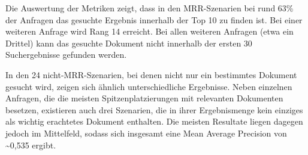 Die Auswertung der Metriken zeigt, dass in den MRR-Szenarien bei rund 63\% der Anfragen das gesuchte Ergebnis innerhalb der Top 10 zu finden ist. Bei einer weiteren Anfrage wird Rang 14 erreicht. Bei allen weiteren Anfragen (etwa ein Drittel) kann das gesuchte Dokument nicht innerhalb der ersten 30 Suchergebnisse gefunden werden.
 
In den 24 nicht-MRR-Szenarien, bei denen nicht nur ein bestimmtes Dokument gesucht wird, zeigen sich ähnlich unterschiedliche Ergebnisse. Neben einzelnen Anfragen, die die meisten Spitzenplatzierungen mit relevanten Dokumenten besetzen, existieren auch drei Szenarien, die in ihrer Ergebnismenge kein einziges als wichtig erachtetes Dokument enthalten. Die meisten Resultate liegen dagegen jedoch im Mittelfeld, sodass sich insgesamt eine Mean Average Precision von \textasciitilde 0,535 ergibt.

